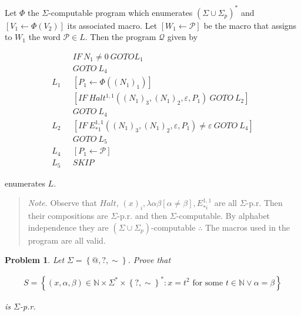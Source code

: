 \documentclass[a4paper, 12pt]{article}
\newtheorem{problem}{Problem}
\newtheorem{problem}{Problem}
\begin{document}
Let $\Phi$ the $\Sigma$-computable program which enumerates $(\Sigma \cup
\Sigma_p)^*$ and $\left[ V_1 \leftarrow \Phi(V_2) \right] $ its associated
macro. Let $[W_1 \leftarrow \mathcal{P}]$ be the macro that assigns to $W_1$ the
word $\mathcal{P} \in  L$. Then the program $\mathcal{Q}$ given by


\begin{align*}
    &IF ~ N_1 \neq 0 ~ GOTO L_1 \\ 
    &GOTO ~ L_4 \\ 
    L_1 ~ ~ ~ &[P_1 \leftarrow \Phi( (N_1)_1 )] \\ 
              & [IF ~ Halt^{1, 1} \left( (N_1)_3, (N_1)_2, \varepsilon, P_1
              \right) ~ GOTO ~ L_2] \\ 
              &GOTO ~ L_4 \\ 
    L_2 ~ ~ ~ & [IF ~ E_{* 1}^{1, 1} \left( (N_1)_3, (N_1)_2, \varepsilon,
    P_1\right) \neq \varepsilon ~ GOTO ~ L_4] \\  
              &GOTO ~ L_5\\
        L_4 ~ ~ ~ & [ P_1 \leftarrow \mathcal{P} ] \\ 
        L_5 ~ ~ ~ &SKIP
\end{align*}

enumerates $L$. 


\small
\begin{quote}

\textit{Note.} Observe that $Halt$, $(x)_i, \lambda \alpha\beta \left[ \alpha
\neq \beta   \right], E_{*i}^{1, 1}$ are all $\Sigma$-p.r.  Then their
compositions are $\Sigma$-p.r. and then $\Sigma$-computable. By alphabet
independence they are $(\Sigma \cup \Sigma_p)$-computable $\therefore $ The
macros used in the program are all valid.

\end{quote}
\normalsize

\pagebreak 

\begin{problem}

    Let $\Sigma = \left\{ @, ?, \sim  \right\} $. Prove that 

    \begin{align*}
        S = \left\{ (x, \alpha, \beta) \in \mathbb{N} \times \Sigma^{*} \times
            \left\{ ?, \sim \right\}^{*} : x = t^2 \text{ for some $t \in \mathbb{N}$}
    \lor \alpha = \beta   \right\} 
    \end{align*}

is $\Sigma$-p.r. 

\end{problem}
\end{document}
